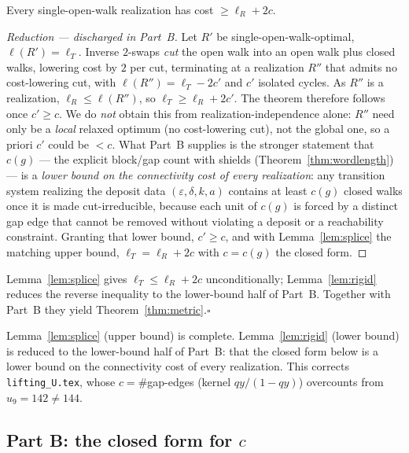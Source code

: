\begin{lemma}\label{lem:rigid}
Every single-open-walk realization has cost $\ge\ell_R+2c$.
\end{lemma}

\begin{proof}[Reduction — discharged in Part~B]
Let $R'$ be single-open-walk-optimal, $\ell(R')=\ell_T$. Inverse $2$-swaps \emph{cut} the open walk
into an open walk plus closed walks, lowering cost by $2$ per cut, terminating at a realization
$R''$ that admits no cost-lowering cut, with $\ell(R'')=\ell_T-2c'$ and $c'$ isolated cycles. As
$R''$ is a realization, $\ell_R\le\ell(R'')$, so $\ell_T\ge\ell_R+2c'$. The theorem therefore follows
once $c'\ge c$. We do \emph{not} obtain this from realization-independence alone: $R''$ need only be a
\emph{local} relaxed optimum (no cost-lowering cut), not the global one, so a priori $c'$ could be
$<c$. What Part~B supplies is the stronger statement that $c(g)$ — the explicit block/gap count with
shields (Theorem~\ref{thm:wordlength}) — is a \emph{lower bound on the connectivity cost of every
realization}: any transition system realizing the deposit data $(\varepsilon,\delta,k,a)$ contains at
least $c(g)$ closed walks once it is made cut-irreducible, because each unit of $c(g)$ is forced by a
distinct gap edge that cannot be removed without violating a deposit or a reachability constraint.
Granting that lower bound, $c'\ge c$, and with Lemma~\ref{lem:splice} the matching upper bound,
$\ell_T=\ell_R+2c$ with $c=c(g)$ the closed form.
\end{proof}

\noindent Lemma~\ref{lem:splice} gives $\ell_T\le\ell_R+2c$ unconditionally; Lemma~\ref{lem:rigid}
reduces the reverse inequality to the lower-bound half of Part~B. Together with Part~B they yield
Theorem~\ref{thm:metric}.\hfill$\square$

\begin{remark}
Lemma~\ref{lem:splice} (upper bound) is complete. Lemma~\ref{lem:rigid} (lower bound) is reduced to
the lower-bound half of Part~B: that the closed form below is a lower bound on the connectivity cost
of every realization. This corrects \texttt{lifting\_U.tex}, whose $c=\#$gap-edges (kernel
$qy/(1-qy)$) overcounts from $u_9=142\ne144$.
\end{remark}

\subsection{Part B: the closed form for \texorpdfstring{$c$}{c}}
\label{ss:partB}

